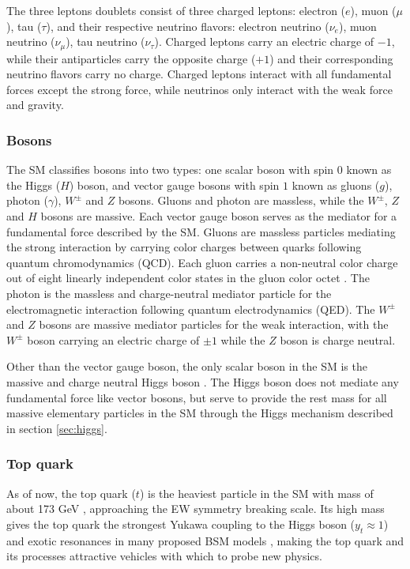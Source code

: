 \documentclass[../thesis.tex]{subfiles}
\begin{document}
The three leptons doublets consist of three charged leptons: electron ($e$), muon ($\mu$), tau ($\tau$), and their respective neutrino flavors: electron neutrino ($\nu_e$), muon neutrino ($\nu_\mu$), tau neutrino ($\nu_\tau$). Charged leptons carry an electric charge of $-1$, while their antiparticles carry the opposite charge ($+1$) and their corresponding neutrino flavors carry no charge. Charged leptons interact with all fundamental forces except the strong force, while neutrinos only interact with the weak force and gravity.

\subsubsection*{Bosons}
The \acs{SM} classifies bosons into two types: one scalar boson with spin $0$ known as the Higgs ($H$) boson, and vector gauge bosons with spin $1$ known as gluons ($g$), photon ($\gamma$), $W^\pm$ and $Z$ bosons. Gluons and photon are massless, while the $W^\pm$, $Z$ and $H$ bosons are massive. Each vector gauge boson serves as the mediator for a fundamental force described by the \acs{SM}. Gluons are massless particles mediating the strong interaction by carrying color charges between quarks following quantum chromodynamics (\acs{QCD}). Each gluon carries a non-neutral color charge out of eight linearly independent color states in the gluon color octet \citep{theory:gellmann}. The photon \tocite is the massless and charge-neutral mediator particle for the electromagnetic interaction following quantum electrodynamics (\acs{QED}). The $W^\pm$ and $Z$ bosons \tocite are massive mediator particles for the weak interaction, with the $W^\pm$ boson carrying an electric charge of $\pm 1$ while the $Z$ boson is charge neutral.

Other than the vector gauge boson, the only scalar boson in the \acs{SM} is the massive and charge neutral Higgs boson \tocite. The Higgs boson does not mediate any fundamental force like vector bosons, but serve to provide the rest mass for all massive elementary particles in the SM through the Higgs mechanism described in section \ref{sec:higgs}.

\subsubsection*{Top quark}
\label{sec:top}

As of now, the top quark ($t$) is the heaviest particle in the \acs{SM} with mass of about 173 GeV \citep{TOPQ-2019-13}, approaching the \acs{EW} symmetry breaking scale. Its high mass gives the top quark the strongest Yukawa coupling to the Higgs boson ($y_t \approx 1$) \citep{theory:top_coupling} and exotic resonances in many proposed \acs{BSM} models \citep{theory:top_exotics,theory:top_exotics2,theory:top_exotics3,theory:top_exotics4}, making the top quark and its processes attractive vehicles with which to probe new physics.
\end{document}
